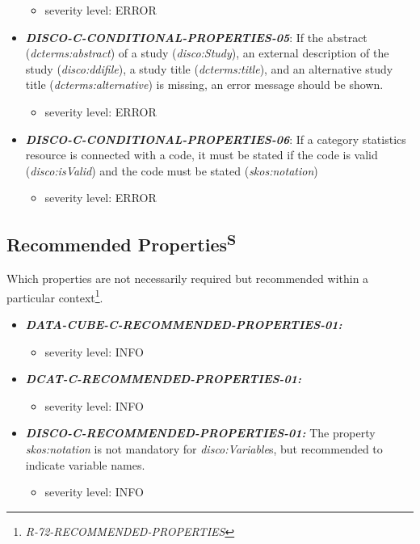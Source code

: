 \documentclass{llncs}
\begin{document}
\begin{itemize}
\begin{itemize}
		\item severity level: ERROR
	\end{itemize}
	\item \textbf{{\em DISCO-C-CONDITIONAL-PROPERTIES-05}}:
	If the abstract (\emph{dcterms:abstract}) of a study (\emph{disco:Study}), an external description of the study (\emph{disco:ddifile}), 
	a study title (\emph{dcterms:title}), and an alternative study title (\emph{dcterms:alternative}) is missing, an error message should be shown.
	\begin{itemize}
		\item severity level: ERROR
	\end{itemize}
	\item \textbf{{\em DISCO-C-CONDITIONAL-PROPERTIES-06}}:
	If a category statistics resource is connected with a code, it must be stated if the code is valid (\emph{disco:isValid}) and the code must be stated (\emph{skos:notation})
	\begin{itemize}
		\item severity level: ERROR
	\end{itemize}
\end{itemize}

\subsection{Recommended Properties\textsuperscript{S}}

Which properties are not necessarily required but recommended within a particular context\footnote{{\em R-72-RECOMMENDED-PROPERTIES}}.

\begin{itemize}
	\item \textbf{{\em DATA-CUBE-C-RECOMMENDED-PROPERTIES-01:}}
	\begin{itemize}
		\item severity level: INFO
	\end{itemize}
\end{itemize}

\begin{itemize}
	\item \textbf{{\em DCAT-C-RECOMMENDED-PROPERTIES-01:}}
	\begin{itemize}
		\item severity level: INFO
	\end{itemize}
\end{itemize}

\begin{itemize}
	\item \textbf{{\em DISCO-C-RECOMMENDED-PROPERTIES-01:}}
  The property {\em skos:notation} is not mandatory for {\em disco:Variable}s, but recommended to indicate variable names.
	\begin{itemize}
		\item severity level: INFO
	\end{itemize}
\end{itemize}
\end{document}
